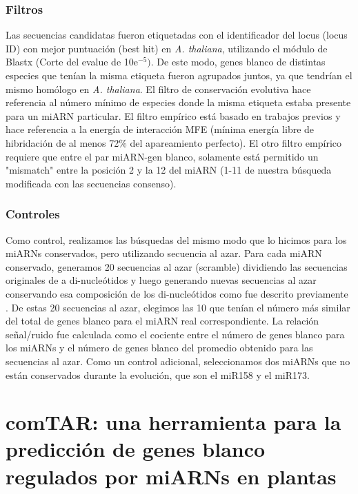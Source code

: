\subsubsection{Filtros}
Las secuencias candidatas fueron etiquetadas con el identificador del locus (locus ID) con mejor puntuación (best hit) en \textit{A. thaliana}, utilizando el módulo de Blastx (Corte del evalue de 10e$^{-5})$.
De este modo, genes blanco de distintas especies que tenían la misma etiqueta fueron agrupados juntos, ya que tendrían el mismo homólogo en \textit{A. thaliana}.
El filtro de conservación evolutiva hace referencia al número mínimo de especies donde la misma etiqueta estaba presente para un miARN particular.
El filtro empírico está basado en trabajos previos \citep{Schwab2005517} y hace referencia a la energía de interacción MFE (mínima energía libre de hibridación de al menos 72\% del apareamiento perfecto).
El otro filtro empírico requiere que entre el par miARN-gen blanco, solamente está permitido un "mismatch" entre la posición 2 y la 12 del miARN (1-11 de nuestra búsqueda modificada con las secuencias consenso).

\subsubsection{Controles}
Como control, realizamos las búsquedas del mismo modo que lo hicimos para los miARNs conservados, pero utilizando secuencia al azar.
Para cada miARN conservado, generamos 20 secuencias al azar (scramble) dividiendo las secuencias originales de a di-nucleótidos y luego generando nuevas secuencias al azar conservando esa composición de los di-nucleótidos como fue descrito previamente \citep{JonesRhoades2004787}.
De estas 20 secuencias al azar, elegimos las 10 que tenían el número más similar del total de genes blanco para el miARN real correspondiente.
La relación señal/ruido fue calculada como el cociente entre el número de genes blanco para los miARNs y el número de genes blanco del promedio obtenido para las secuencias al azar.
Como un control adicional, seleccionamos dos miARNs que no están conservados durante la evolución, que son el miR158 y el miR173.



\section{comTAR: una herramienta para la predicción de genes blanco regulados por miARNs en plantas}

